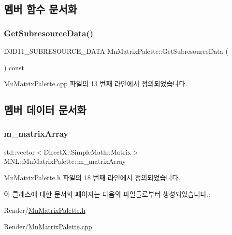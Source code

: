 \subsection{멤버 함수 문서화}
\mbox{\label{class_m_n_l_1_1_mn_matrix_palette_ad7ffb57f4795ced63d95eb0fef6220aa}} 
\subsubsection{\texorpdfstring{Get\+Subresource\+Data()}{GetSubresourceData()}}
{\footnotesize\ttfamily D3\+D11\+\_\+\+S\+U\+B\+R\+E\+S\+O\+U\+R\+C\+E\+\_\+\+D\+A\+TA Mn\+Matrix\+Palette\+::\+Get\+Subresource\+Data (\begin{DoxyParamCaption}{ }\end{DoxyParamCaption}) const}



Mn\+Matrix\+Palette.\+cpp 파일의 13 번째 라인에서 정의되었습니다.



\subsection{멤버 데이터 문서화}
\mbox{\label{class_m_n_l_1_1_mn_matrix_palette_a75048f096e7fe205df32f0603f96a50a}} 
\subsubsection{\texorpdfstring{m\+\_\+matrix\+Array}{m\_matrixArray}}
{\footnotesize\ttfamily std\+::vector$<$Direct\+X\+::\+Simple\+Math\+::\+Matrix$>$ M\+N\+L\+::\+Mn\+Matrix\+Palette\+::m\+\_\+matrix\+Array\hspace{0.3cm}{\ttfamily [private]}}



Mn\+Matrix\+Palette.\+h 파일의 18 번째 라인에서 정의되었습니다.



이 클래스에 대한 문서화 페이지는 다음의 파일들로부터 생성되었습니다.\+:\begin{DoxyCompactItemize}
\item 
Render/\hyperlink{_mn_matrix_palette_8h}{Mn\+Matrix\+Palette.\+h}\item 
Render/\hyperlink{_mn_matrix_palette_8cpp}{Mn\+Matrix\+Palette.\+cpp}\end{DoxyCompactItemize}
